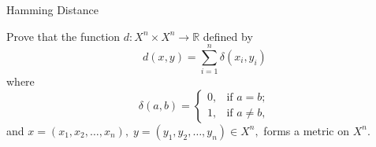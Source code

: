 \documentclass[12pt, a4paper]{article}
\begin{document}
\clearpage

\begin{heading}
    Hamming Distance
\end{heading}

\vspace{10pt}

\begin{theorem}
Prove that the function
\(d : X^n \times X^n \to \mathbb{R}\)
defined by
\[d(x,y)=\sum_{i=1}^{n}\delta(x_i,y_i)\]
where
\[\delta(a,b)=\begin{cases}
0, & \text{if } a=b;\\
1, & \text{if } a\ne b,
\end{cases}\]
and \(x=(x_1,x_2,\dots,x_n),\;
y=(y_1,y_2,\dots,y_n)\in X^n,\)
forms a metric on $X^n$.
\end{theorem}





\EndPage
\end{document}
